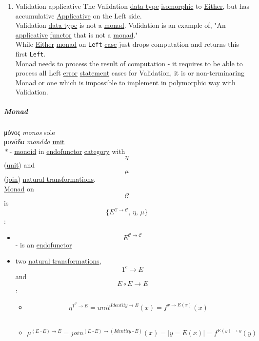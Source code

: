 \documentclass[11pt]{article}
\begin{document}
\begin{enumerate}
\item \label{org643ebc8}Validation applicative
\label{sec:org149d4d1}
The Validation \hyperref[org965cde3]{data type} \hyperref[org6d62cf4]{isomorphic} to \hyperref[orgbc5fdf7]{Either}, but has accumulative \hyperref[org24a6930]{Applicative} on the Left side.\\
Validation \hyperref[org965cde3]{data type} is not a \hyperref[org268aaf1]{monad}. Validation is an example of, "An \hyperref[org24a6930]{applicative} \hyperref[org6073683]{functor} that is not a \hyperref[org268aaf1]{monad}."\\
While \hyperref[orgbc5fdf7]{Either} \hyperref[org268aaf1]{monad} on \texttt{Left} \hyperref[org96bceb0]{case} just drops computation and returns this first \texttt{Left}.\\
\hyperref[org268aaf1]{Monad} needs to process the result of computation - it requires to be able to process all Left \hyperref[orgb69b647]{error} \hyperref[org0fdd00d]{statement} cases for Validation, it is or non-terminaring \hyperref[org268aaf1]{Monad} or one which is impossible to implement in \hyperref[org84d7fee]{polymorphic} way with Validation.\\
\end{enumerate}

\subparagraph{\label{org268aaf1}Monad}
\label{sec:org507d16f}
μόνος \emph{monos} sole\\
μονάδα \emph{monáda} \hyperref[org2833f3f]{unit}\\

\emph{*} - \hyperref[org8ff50ea]{monoid} in \hyperref[org4dce7a1]{endofunctor} \hyperref[org3e3a79b]{category} with $$ \eta $$ (\hyperref[org2833f3f]{unit}) and $$ \mu $$ (\hyperref[orgcf84bcb]{join}) \hyperref[org740b530]{natural transformations}.\\

\hyperref[org268aaf1]{Monad} on $$ \mathcal{C} $$ is $$ \{E^{\mathcal{C \to C}}, \, \eta, \, \mu\} $$:\\
\begin{itemize}
\item $$ E^{\mathcal{C \to C}} $$ - is an \hyperref[org4dce7a1]{endofunctor}\\
\item two \hyperref[org740b530]{natural transformations}, $$ 1^c \to E $$ and $$ E \circ E \to E $$:\\
\begin{itemize}
\item $$ \eta^{1^{\mathcal{C}} \to E} = {unit}^{Identity \to E}(x) = f^{ x \to E(x)}(x) $$\\
\item $$ \mu^{(E \circ E) \to E} = {join}^{(E \circ E) \to (Identity \circ E)}(x) = | y = E(x) | = f^{E (y) \to y}(y) $$\\
\end{itemize}
\end{itemize}
\end{document}
